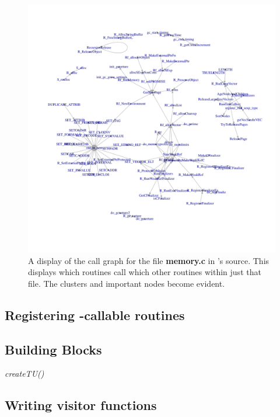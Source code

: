 \documentclass[article]{jss}
\def\R{\proglang{R}}
\def\Rfunc#1{\textsl{#1()}}
\def\file#1{\textbf{#1}}
\begin{document}
\begin{figure}
\includegraphics{callgraph.pdf}
\caption{A display of the call graph for the file \file{memory.c} in
  \R's source. This displays which routines call which other routines
  within just that file. The clusters and important nodes become evident.}
  \label{fig:callgraph}
\end{figure}


\subsection[Registering R-callable routines]{Registering \R-callable routines}

\subsection{Building Blocks}\label{sec:BuildingBlocks}

\Rfunc{createTU}


\subsection{Writing visitor functions}
\end{document}
